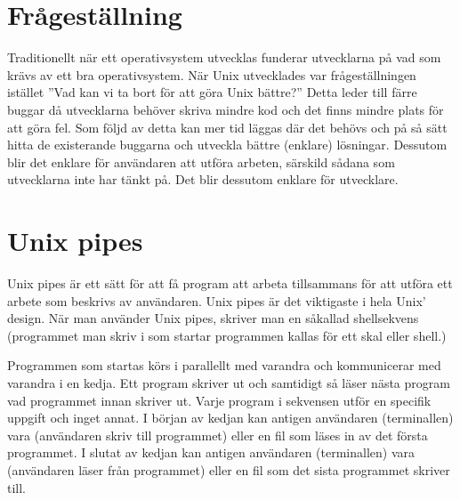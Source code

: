 \documentclass[12pt,a4paper]{article}
\begin{document}
\section*{Frågeställning}

Traditionellt när ett operativsystem utvecklas funderar
utvecklarna på vad som krävs av ett bra operativsystem.
När Unix utvecklades var frågeställningen istället ''Vad
kan vi ta bort för att göra Unix bättre?'' Detta leder
till färre buggar då utvecklarna behöver skriva mindre
kod och det finns mindre plats för att göra fel.
Som följd av detta kan mer tid läggas där det behövs
och på så sätt hitta de existerande buggarna och utveckla
bättre (enklare) lösningar. Dessutom blir det enklare för
användaren att utföra arbeten, särskild sådana som
utvecklarna inte har tänkt på. Det blir dessutom enklare
för utvecklare.


\section*{Unix pipes}

Unix pipes är ett sätt för att få program att arbeta
tillsammans för att utföra ett arbete som beskrivs
av användaren. Unix pipes är det viktigaste i hela
Unix' design. När man använder Unix pipes, skriver
man en såkallad shellsekvens (programmet man skriv
i som startar programmen kallas för ett skal eller shell.)

Programmen som startas körs i parallellt med varandra
och kommunicerar med varandra i en kedja. Ett program
skriver ut och samtidigt så läser nästa program vad
programmet innan skriver ut. Varje program i sekvensen
utför en specifik uppgift och inget annat.
I början av kedjan kan antigen användaren (terminallen)
vara (användaren skriv till programmet) eller en fil som
läses in av det första programmet.
I slutat av kedjan kan antigen användaren (terminallen)
vara (användaren läser från programmet) eller en fil som
det sista programmet skriver till.
\end{document}
